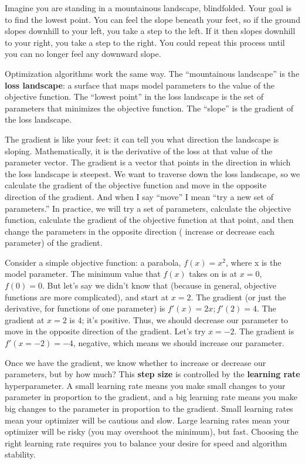 Imagine you are standing in a mountainous landscape, blindfolded. Your goal is to find the lowest point. You can feel the slope beneath your feet, so if the ground slopes downhill to your left, you take a step to the left. If it then slopes downhill to your right, you take a step to the right. You could repeat this process until you can no longer feel any downward slope.

Optimization algorithms work the same way. The ``mountainous landscape'' is the \textbf{loss landscape}: a surface that maps model parameters to the value of the objective function. The ``lowest point'' in the loss landscape is the set of parameters that minimizes the objective function. The ``slope'' is the gradient of the loss landscape.

The gradient is like your feet: it can tell you what direction the landscape is sloping. Mathematically, it is the derivative of the loss at that value of the parameter vector. The gradient is a vector that points in the direction in which the loss landscape is steepest. We want to traverse down the loss landscape, so we calculate the gradient of the objective function and move in the opposite direction of the gradient. And when I say ``move'' I mean ``try a new set of parameters.'' In practice, we will try a set of parameters, calculate the objective function, calculate the gradient of the objective function at that point, and then change the parameters in the opposite direction (\ie{} increase or decrease each parameter) of the gradient.

Consider a simple objective function: a parabola, $f(x)=x^2$, where x is the model parameter. The minimum value that $f(x)$ takes on is at $x=0$, $f(0)=0$. But let's say we didn't know that (because in general, objective functions are more complicated), and start at $x=2$. The gradient (or just the derivative, for functions of one parameter) is $f'(x)=2x;f'(2)=4$. The gradient at $x=2$ is $4$; it's positive. Thus, we should decrease our parameter to move in the opposite direction of the gradient. Let's try $x=-2$. The gradient is $f'(x=-2)=-4$, negative, which means we should increase our parameter.

Once we have the gradient, we know whether to increase or decrease our parameters, but by how much? This \textbf{step size} is controlled by the \textbf{learning rate} hyperparameter. A small learning rate means you make small changes to your parameter in proportion to the gradient, and a big learning rate means you make big changes to the parameter in proportion to the gradient. Small learning rates mean your optimizer will be cautious and slow. Large learning rates mean your optimizer will be risky (you may overshoot the minimum), but fast. Choosing the right learning rate requires you to balance your desire for speed and algorithm stability.

